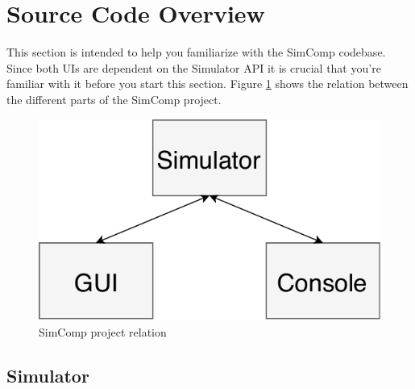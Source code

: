 \section{Source Code Overview}
This section is intended to help you familiarize with the SimComp codebase. Since both UIs are dependent on the Simulator API it is crucial that you're familiar with it before you start this section. Figure \ref{fig:relation} shows the relation between the different parts of the SimComp project.

\begin{figure}[H]
\centering
\includegraphics[scale=0.5]{img/SimComp-relation.pdf}
\caption{SimComp project relation}
\label{fig:relation}
\end{figure}

\subsection{Simulator}
